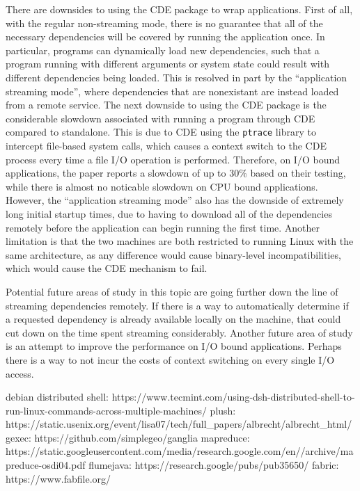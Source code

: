 \documentclass[11pt]{article}
\newcommand{\cde}{\textsc{CDE}\xspace}
\begin{document}
There are downsides to using the \cde package to wrap applications. First of all, with the regular non-streaming mode, there is no guarantee that all of the necessary dependencies will be covered by running the application once. In particular, programs can dynamically load new dependencies, such that a program running with different arguments or system state could result with different dependencies being loaded. This is resolved in part by the ``application streaming mode'', where dependencies that are nonexistant are instead loaded from a remote service. The next downside to using the \cde package is the considerable slowdown associated with running a program through \cde compared to standalone. This is due to \cde using the \texttt{ptrace} library to intercept file-based system calls, which causes a context switch to the \cde process every time a file I/O operation is performed. Therefore, on I/O bound applications, the paper reports a slowdown of up to 30\% based on their testing, while there is almost no noticable slowdown on CPU bound applications. However, the ``application streaming mode'' also has the downside of extremely long initial startup times, due to having to download all of the dependencies remotely before the application can begin running the first time. Another limitation is that the two machines are both restricted to running Linux with the same architecture, as any difference would cause binary-level incompatibilities, which would cause the \cde mechanism to fail.

Potential future areas of study in this topic are going further down the line of streaming dependencies remotely. If there is a way to automatically determine if a requested dependency is already available locally on the machine, that could cut down on the time spent streaming considerably.
Another future area of study is an attempt to improve the performance on I/O bound applications. Perhaps there is a way to not incur the costs of context switching on every single I/O access.

debian distributed shell: https://www.tecmint.com/using-dsh-distributed-shell-to-run-linux-commands-across-multiple-machines/
plush: https://static.usenix.org/event/lisa07/tech/full_papers/albrecht/albrecht_html/
gexec: https://github.com/simplegeo/ganglia
mapreduce: https://static.googleusercontent.com/media/research.google.com/en//archive/mapreduce-osdi04.pdf
flumejava: https://research.google/pubs/pub35650/
fabric: https://www.fabfile.org/



\end{document}
